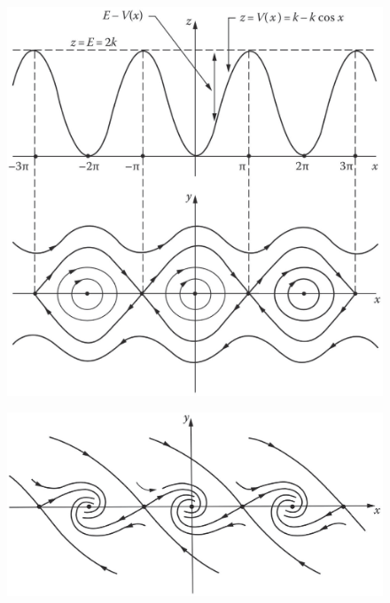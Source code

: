 \documentclass[12pt,a4paper]{article}
\begin{document}
\begin{figure}
\centering
\includegraphics[height=14.cm, angle=0]{phase_pendulum.eps}
\caption{
}
\label{fig:phase_pendulum}
\end{figure}

\begin{figure}
\centering
\includegraphics[height=8.cm, angle=0]{phase_pendulum2.eps}
\caption{
}
\label{fig:phase_pendulum2}
\end{figure}
\end{document}
